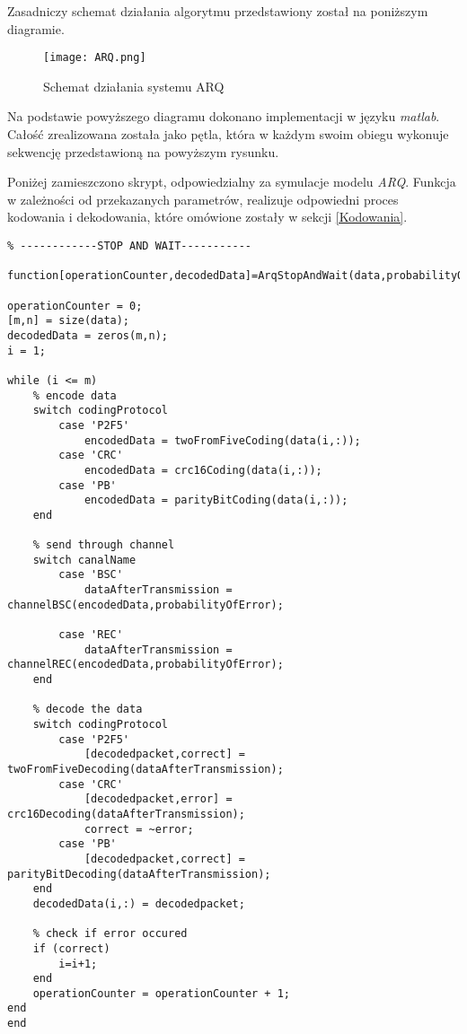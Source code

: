 \documentclass{article}
\begin{document}
Zasadniczy schemat działania algorytmu przedstawiony został na poniższym diagramie.


\begin{figure}[h!]
    \centering
    \texttt{[image: ARQ.png]}
    \caption{Schemat działania systemu ARQ}
    \label{fig:StopAndWait}
\end{figure}

Na podstawie powyższego diagramu dokonano implementacji w języku \textit{matlab}. Całość zrealizowana została jako pętla, która w każdym swoim obiegu wykonuje sekwencję przedstawioną na powyższym rysunku.

Poniżej zamieszczono skrypt, odpowiedzialny za symulacje modelu \textit{ARQ}. Funkcja w zależności od przekazanych parametrów, realizuje odpowiedni proces kodowania i dekodowania, które omówione zostały w sekcji \ref{Kodowania}.

\newpage

\begin{verbatim}
% ------------STOP AND WAIT-----------

function[operationCounter,decodedData]=ArqStopAndWait(data,probabilityOfError,canalName,codingProtocol)

operationCounter = 0;
[m,n] = size(data);
decodedData = zeros(m,n);
i = 1;

while (i <= m)
    % encode data
    switch codingProtocol
        case 'P2F5'
            encodedData = twoFromFiveCoding(data(i,:));
        case 'CRC'
            encodedData = crc16Coding(data(i,:));
        case 'PB'
            encodedData = parityBitCoding(data(i,:));     
    end
    
    % send through channel
    switch canalName
        case 'BSC'
            dataAfterTransmission = channelBSC(encodedData,probabilityOfError);
            
        case 'REC'
            dataAfterTransmission = channelREC(encodedData,probabilityOfError);
    end   
    
    % decode the data
    switch codingProtocol
        case 'P2F5'
            [decodedpacket,correct] = twoFromFiveDecoding(dataAfterTransmission);
        case 'CRC'
            [decodedpacket,error] = crc16Decoding(dataAfterTransmission);
            correct = ~error;
        case 'PB'
            [decodedpacket,correct] = parityBitDecoding(dataAfterTransmission);     
    end
    decodedData(i,:) = decodedpacket;
    
    % check if error occured
    if (correct)
        i=i+1;
    end
    operationCounter = operationCounter + 1;
end
end
\end{verbatim}
\end{document}
